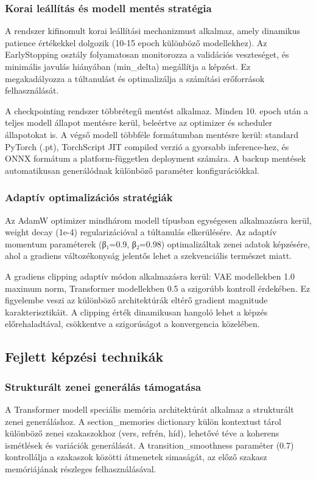 \subsubsection{Korai leállítás és modell mentés stratégia}
A rendszer kifinomult korai leállítási mechanizmust alkalmaz, amely dinamikus patience értékekkel dolgozik (10-15 epoch különböző modellekhez). Az EarlyStopping osztály folyamatosan monitorozza a validációs veszteséget, és minimális javulás hiányában (min_delta) megállítja a képzést. Ez megakadályozza a túltanulást és optimalizálja a számítási erőforrások felhasználását.

A checkpointing rendszer többrétegű mentést alkalmaz. Minden 10. epoch után a teljes modell állapot mentésre kerül, beleértve az optimizer és scheduler állapotokat is. A végső modell többféle formátumban mentésre kerül: standard PyTorch (.pt), TorchScript JIT compiled verzió a gyorsabb inference-hez, és ONNX formátum a platform-független deployment számára. A backup mentések automatikusan generálódnak különböző paraméter konfigurációkkal.

\subsubsection{Adaptív optimalizációs stratégiák}
Az AdamW optimizer mindhárom modell típusban egységesen alkalmazásra kerül, weight decay (1e-4) regularizációval a túltanulás elkerülésére. Az adaptív momentum paraméterek (β₁=0.9, β₂=0.98) optimalizáltak zenei adatok képzésére, ahol a gradiens változékonyság jelentős lehet a szekvenciális természet miatt.

A gradiens clipping adaptív módon alkalmazásra kerül: VAE modellekben 1.0 maximum norm, Transformer modellekben 0.5 a szigorúbb kontroll érdekében. Ez figyelembe veszi az különböző architektúrák eltérő gradient magnitude karakterisztikáit. A clipping érték dinamikusan hangoló lehet a képzés előrehaladtával, csökkentve a szigorúságot a konvergencia közelében.
\subsection{Fejlett képzési technikák}

\subsubsection{Strukturált zenei generálás támogatása}
A Transformer modell speciális memória architektúrát alkalmaz a strukturált zenei generáláshoz. A section_memories dictionary külön kontextust tárol különböző zenei szakaszokhoz (vers, refrén, híd), lehetővé téve a koherens ismétlések és variációk generálását. A transition_smoothness paraméter (0.7) kontrollálja a szakaszok közötti átmenetek simaságát, az előző szakasz memóriájának részleges felhasználásával.

